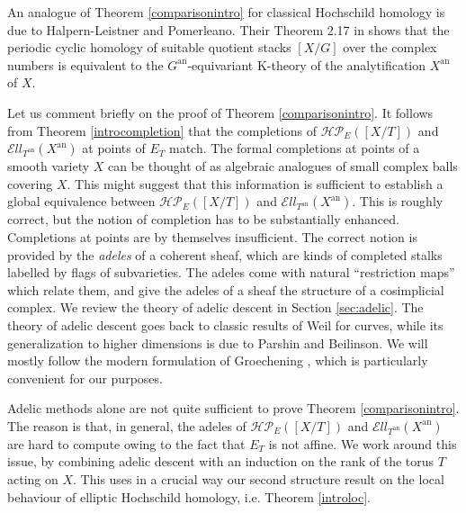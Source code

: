 \documentclass[11pt,letterpaper]{amsart}
\newcommand{\cHP}{\mathcal{HP}}
\newcommand{\El}{\mathcal{E}ll}
\newcommand{\an}{\mathrm{an}}
\begin{document}
An analogue of Theorem \ref{comparisonintro} for classical Hochschild homology is due to Halpern-Leistner and Pomerleano. Their Theorem 2.17 in \cite{HLPom} shows that the periodic cyclic homology of suitable quotient stacks $[X/G]$ over the complex numbers is equivalent to the $G^\an$-equivariant K-theory of the analytification $X^\an$ of $X$.




Let us comment briefly on the proof of Theorem \ref{comparisonintro}. It follows from   Theorem \ref{introcompletion} that the completions of $\cHP_E([X/T])$ and $\El_{T^{\an}}(X^{\an})$ at points of $E_T$ match. The formal completions at points of a smooth variety $X$ can be thought of as algebraic analogues of small complex balls covering $X$. This might suggest that this information is sufficient to establish a global equivalence between $\cHP_E([X/T])$ and $\El_{T^{\an}}(X^{\an})$. %
This is roughly correct, but  %
the notion of completion has to be substantially enhanced. Completions at points  are by themselves insufficient. The correct notion is provided by the \emph{adeles} of a coherent sheaf, which are kinds of completed stalks labelled by flags of subvarieties. The adeles come with natural ``restriction maps'' which relate them, and give the adeles of a sheaf the structure of a cosimplicial complex. We review the theory of adelic descent in Section \ref{sec:adelic}. The theory of adelic descent goes back to  classic results of Weil  for curves, while its generalization to higher dimensions is due to Parshin and Beilinson. We will mostly follow the modern formulation of  Groechening \cite{Groech}, which is particularly convenient for our purposes.  


Adelic methods alone are not quite sufficient to prove Theorem \ref{comparisonintro}. The reason is that, in general, the adeles of $\cHP_E([X/T])$ and $\El_{T^{\an}}(X^{\an})$ are hard to compute owing to the fact that $E_T$ is not affine. %
We work around this issue, by combining adelic descent with an induction on the rank of the torus $T$ acting on $X$. This uses in a crucial way our second structure result on the local behaviour of elliptic Hochschild homology, i.e.  Theorem \ref{introloc}.  
\end{document}
